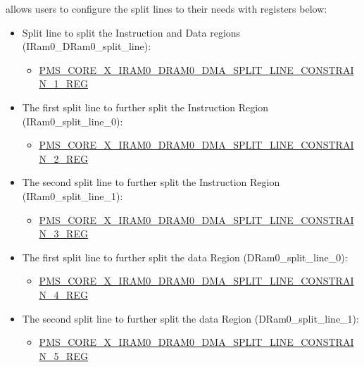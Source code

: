 \documentclass[main\_\_EN.tex]{subfiles}
\begin{document}
\chipname{} allows users to configure the split lines to their needs with registers below:
\begin{itemize}
    \item Split line to split the Instruction and Data regions (IRam0\_DRam0\_split\_line):
    \begin{itemize}
        \item \hyperref[regdesc:PMSCOREXIRAM0DRAM0DMASPLITLINECONSTRAIN1REG]{PMS\_CORE\_X\_IRAM0\_DRAM0\_DMA\_SPLIT\_LINE\_CONSTRAIN\_1\_REG}
    \end{itemize}
    \item The first split line to further split the Instruction Region (IRam0\_split\_line\_0):
    \begin{itemize}
        \item \hyperref[regdesc:PMSCOREXIRAM0DRAM0DMASPLITLINECONSTRAIN2REG]{PMS\_CORE\_X\_IRAM0\_DRAM0\_DMA\_SPLIT\_LINE\_CONSTRAIN\_2\_REG}
    \end{itemize}
    \item The second split line to further split the Instruction Region (IRam0\_split\_line\_1):
    \begin{itemize}
        \item \hyperref[regdesc:PMSCOREXIRAM0DRAM0DMASPLITLINECONSTRAIN3REG]{PMS\_CORE\_X\_IRAM0\_DRAM0\_DMA\_SPLIT\_LINE\_CONSTRAIN\_3\_REG}
    \end{itemize}
    \item The first split line to further split the data Region (DRam0\_split\_line\_0):
    \begin{itemize}
        \item \hyperref[regdesc:PMSCOREXIRAM0DRAM0DMASPLITLINECONSTRAIN4REG]{PMS\_CORE\_X\_IRAM0\_DRAM0\_DMA\_SPLIT\_LINE\_CONSTRAIN\_4\_REG}
    \end{itemize}
    \item The second split line to further split the data Region (DRam0\_split\_line\_1):
    \begin{itemize}
        \item \hyperref[regdesc:PMSCOREXIRAM0DRAM0DMASPLITLINECONSTRAIN5REG]{PMS\_CORE\_X\_IRAM0\_DRAM0\_DMA\_SPLIT\_LINE\_CONSTRAIN\_5\_REG}
    \end{itemize}
\end{itemize}
\end{document}
